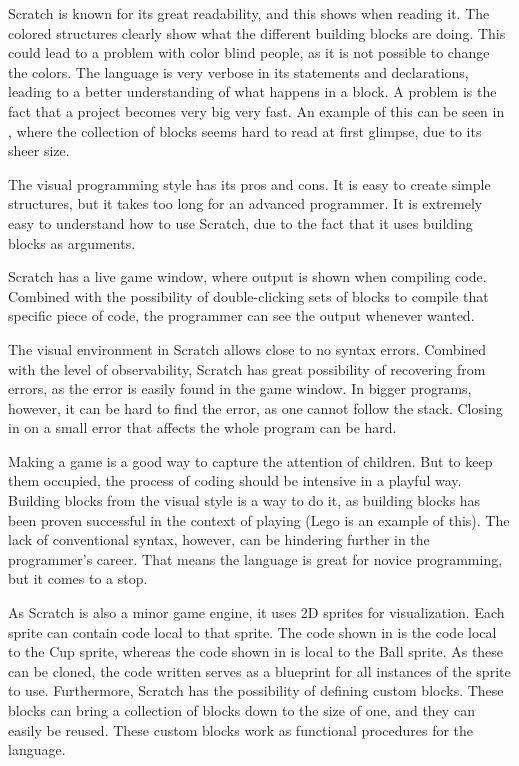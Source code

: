 \begin{description}[style=nextline]
\item[Readability] Scratch is known for its great readability, and this shows when reading it. The colored structures clearly show what the different building blocks are doing. This could lead to a problem with color blind people, as it is not possible to change the colors. The language is very verbose in its statements and declarations, leading to a better understanding of what happens in a block. A problem is the fact that a project becomes very big very fast. An example of this can be seen in , where the collection of blocks seems hard to read at first glimpse, due to its sheer size.
\item[Writability] The visual programming style has its pros and cons. It is easy to create simple structures, but it takes too long for an advanced programmer. It is extremely easy to understand how to use Scratch, due to the fact that it uses building blocks as arguments.
\item[Observability] Scratch has a live game window, where output is shown when compiling code. Combined with the possibility of double-clicking sets of blocks to compile that specific piece of code, the programmer can see the output whenever wanted.
\item[Trialability] The visual environment in Scratch allows close to no syntax errors. Combined with the level of observability, Scratch has great possibility of recovering from errors, as the error is easily found in the game window. In bigger programs, however, it can be hard to find the error, as one cannot follow the stack. Closing in on a small error that affects the whole program can be hard.
\item[Learnability] Making a game is a good way to capture the attention of children. But to keep them occupied, the process of coding should be intensive in a playful way. Building blocks from the visual style is a way to do it, as building blocks has been proven successful in the context of playing (Lego is an example of this). The lack of conventional syntax, however, can be hindering further in the programmer's career. That means the language is great for novice programming, but it comes to a stop.
\item[Reusability] As Scratch is also a minor game engine, it uses 2D sprites for visualization. Each sprite can contain code local to that sprite. The code shown in  is the code local to the Cup sprite, whereas the code shown in  is local to the Ball sprite. As these can be cloned, the code written serves as a blueprint for all instances of the sprite to use. Furthermore, Scratch has the possibility of defining custom blocks. These blocks can bring a collection of blocks down to the size of one, and they can easily be reused. These custom blocks work as functional procedures for the language.

\end{description}

